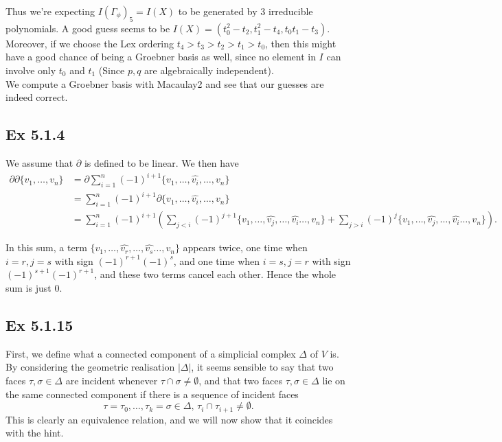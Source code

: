 \documentclass{article}
\theoremstyle{definition}
\begin{document}
Thus we're expecting $I(\Gamma_{\phi})_5 = I(X)$ to be generated by $3$
irreducible polynomials. A good guess seems to be $I(X) = (t_0^2 - t_2, t_1^2 -
t_4, t_0t_1 - t_3)$. Moreover, if we choose the Lex ordering $t_4 > t_3 > t_2 >
t_1 > t_0$, then this might have a good chance of being a Groebner basis as
well, since no element in $I$ can involve only $t_0$ and $t_1$ (Since $p, q$
are algebraically independent). \\

We compute a Groebner basis with Macaulay2 and see that our guesses are indeed
correct.

\subsection*{Ex 5.1.4}

We assume that $\partial$ is defined to be linear.
We then have
\begin{align*}
	\partial \partial \{ v_1, \ldots, v_n \}
	&=
	\partial 
	\sum_{i = 1}^{n} 
	(-1)^{i + 1} 
	\{ v_1, \ldots, \hat{v_i}, \ldots, v_n \} \\
	&=
	\sum_{i = 1}^{n} 
	(-1)^{i + 1} 
	\partial 
	\{ v_1, \ldots, \hat{v_i}, \ldots, v_n \} \\
	&=
	\sum_{i = 1}^{n} 
	(-1)^{i + 1} 
	\left(
		\sum_{j < i}
		(-1)^{j + 1}
		\{ v_1, \ldots, \hat{v_j}, \ldots, \hat{v_i} \ldots, v_n \}
		+
		\sum_{j > i}
		(-1)^{j}
		\{ v_1, \ldots, \hat{v_j}, \ldots, \hat{v_i} \ldots, v_n \}
	\right).
\end{align*}

In this sum, a term $\{ v_1, \ldots, \hat{v_r}, \ldots, \hat{v_s} \ldots, v_n
\}$ appears twice, one time when $i = r, j = s$ with sign $(-1)^{r +
1}(-1)^{s}$, and one time when $i = s, j = r$ with sign $(-1)^{s + 1}(-1)^{r +
1}$, and these two terms cancel each other. Hence the whole sum is just $0$.

\subsection*{Ex 5.1.15}

First, we define what a connected component of a simplicial complex $\Delta$ of
$V$ is. By considering the geometric realisation $|\Delta|$, it seems sensible
to say that two faces $\tau, \sigma \in \Delta$ are incident whenever $\tau
\cap \sigma \not = \emptyset$, and that two faces $\tau, \sigma \in \Delta$ lie
on the same connected component if there is a sequence of incident faces
\[
	\tau = \tau_0, \ldots, \tau_k = \sigma \in \Delta,\, 
	\tau_i \cap \tau_{i + 1} \not = \emptyset.
\] 
This is clearly an equivalence relation, and we will now show that it coincides
with the hint. \\
\end{document}
